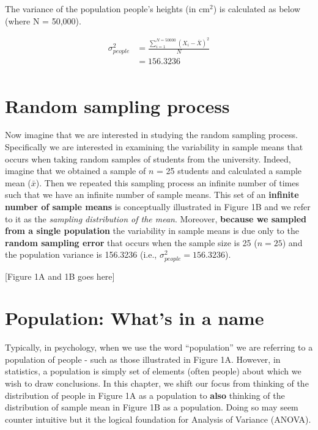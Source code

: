 \documentclass[
]{krantz}
\begin{document}
The variance of the population people's heights (in cm\(^2\)) is calculated as below (where N = 50,000).

\[
\begin{aligned} 
\sigma_{people}^2 &= \frac{\sum_{i=1}^{N=50000}{(X_i - \bar{X})^2}}{N}\\
&= 156.3236\\
\end{aligned} 
\]

\hypertarget{random-sampling-process}{%
\section{Random sampling process}\label{random-sampling-process}}

Now imagine that we are interested in studying the random sampling process. Specifically we are interested in examining the variability in sample means that occurs when taking random samples of students from the university. Indeed, imagine that we obtained a sample of \(n\) = 25 students and calculated a sample mean (\(\bar{x}\)). Then we repeated this sampling process an infinite number of times such that we have an infinite number of sample means. This set of an \textbf{infinite number of sample means} is conceptually illustrated in Figure 1B and we refer to it as the \emph{sampling distribution of the mean}. Moreover, \textbf{because we sampled from a single population} the variability in sample means is due only to the \textbf{random sampling error} that occurs when the sample size is 25 (\(n = 25\)) and the population variance is 156.3236 (i.e., \(\sigma_{people}^2 =156.3236\)).

{[}Figure 1A and 1B goes here{]}

\hypertarget{population-whats-in-a-name}{%
\section{Population: What's in a name}\label{population-whats-in-a-name}}

Typically, in psychology, when we use the word ``population'' we are referring to a population of people - such as those illustrated in Figure 1A. However, in statistics, a population is simply set of elements (often people) about which we wish to draw conclusions. In this chapter, we shift our focus from thinking of the distribution of people in Figure 1A as a population to \textbf{also} thinking of the distribution of sample mean in Figure 1B as a population. Doing so may seem counter intuitive but it the logical foundation for Analysis of Variance (ANOVA).
\end{document}
